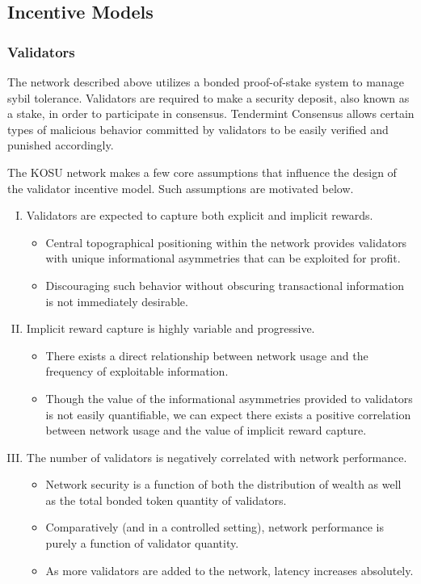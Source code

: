 \documentclass[10pt]{article}
\begin{document}
\subsection{Incentive Models}\label{incentive-models}

\subsubsection{Validators}\label{incentive-models-validators}
The network described above utilizes a bonded proof-of-stake system to manage sybil tolerance. Validators are required to make a security deposit, also known as a stake, in order to participate in consensus. Tendermint Consensus allows certain types of malicious behavior committed by validators to be easily verified and punished accordingly. 
\medskip

The KOSU network makes a few core assumptions that influence the design of the validator incentive model. Such assumptions are motivated below.

\begin{enumerate}[I.]
  \item Validators are expected to capture both explicit and implicit rewards.
  \begin{itemize}
    \item Central topographical positioning within the network provides validators with unique informational asymmetries that can be exploited for profit.
    \item Discouraging such behavior without obscuring transactional information is not immediately desirable.
  \end{itemize}
  \item Implicit reward capture is highly variable and progressive.
  \begin{itemize}
    \item There exists a direct relationship between network usage and the frequency of exploitable information.
    \item Though the value of the informational asymmetries provided to validators is not easily quantifiable, we can expect there exists a positive correlation between network usage and the value of implicit reward capture.
  \end{itemize}
  \item The number of validators is negatively correlated with network performance.
  \begin{itemize}
    \item Network security is a function of both the distribution of wealth as well as the total bonded token quantity of validators.
    \item Comparatively (and in a controlled setting), network performance is purely a function of validator quantity.
    \item As more validators are added to the network, latency increases absolutely.
  \end{itemize}
\end{enumerate}
\end{document}
